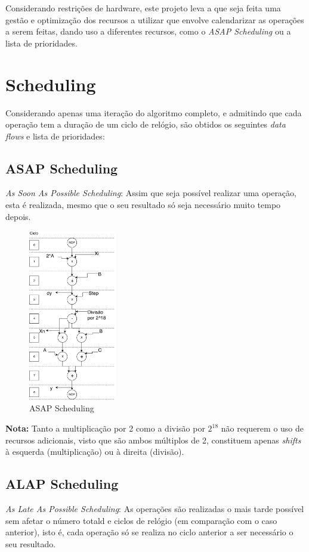\documentclass{article} %
\begin{document}
		\noindent Considerando restrições de hardware, este projeto leva a que seja feita uma gestão e optimização dos recursos a utilizar que envolve calendarizar as operações a serem feitas, dando uso a diferentes recursos, como o \emph{ASAP Scheduling} ou a lista de prioridades.

	\section{Scheduling}
		Considerando apenas uma iteração do algoritmo completo, e admitindo que cada operação tem a duração de um ciclo de relógio, são obtidos os seguintes \emph{data flows} e lista de prioridades:

		\subsection{ASAP Scheduling}
			\emph{As Soon As Possible Scheduling}: Assim que seja possível realizar uma operação, esta é realizada, mesmo que o seu resultado só seja necessário muito tempo depois.


			\begin{figure}[ht]
				\begin{center}
					\includegraphics[width=1.5in]{ASAP.pdf}
					\caption{ASAP Scheduling}
					\label{fig:ASAP}
				\end{center}
			\end{figure}
			
			\textbf{Nota:} Tanto a multiplicação por 2 como a divisão por $2^{18}$ não requerem o uso de recursos adicionais, visto que são ambos múltiplos de 2, constituem apenas \emph{shifts} à esquerda (multiplicação) ou à direita (divisão). 

		\clearpage

		\subsection{ALAP Scheduling}
			\emph{As Late As Possible Scheduling}: As operações são realizadas o mais tarde possível sem afetar o número totald e ciclos de relógio (em comparação com o caso anterior), isto é, cada operação só se realiza no ciclo anterior a ser necessário o seu resultado.\\
\end{document}
